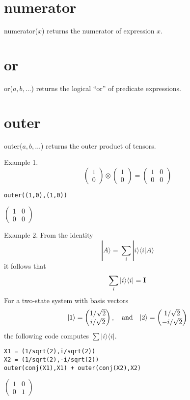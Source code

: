 \section*{numerator}
numerator($x$) returns the numerator of expression $x$.

\section*{or}
or($a,b,\ldots$) returns the logical ``or'' of predicate expressions.

\section*{outer}
outer($a,b,\ldots$) returns the outer product of tensors.

Example 1.
\[
\begin{pmatrix}
1\\
0
\end{pmatrix}
\otimes
\begin{pmatrix}
1\\
0
\end{pmatrix}
=\begin{pmatrix}
1 & 0\\
0 & 0
\end{pmatrix}
\]

\begin{Verbatim}[formatcom=\color{blue}]
outer((1,0),(1,0))
\end{Verbatim}

$\displaystyle
\begin{pmatrix}
1 & 0\\
0 & 0
\end{pmatrix}
$

\bigskip
Example 2. From the identity
\[
|A\rangle=\sum_i|i\rangle\langle i|A\rangle
\]
it follows that
\[
\sum_i|i\rangle\langle i|=\bf I
\]
For a two-state system with basis vectors
\[
|1\rangle=\begin{pmatrix}1/\sqrt2\\i/\sqrt2\end{pmatrix},
\hbox{\quad and\quad}
|2\rangle=\begin{pmatrix}1/\sqrt2\\-i/\sqrt2\end{pmatrix}
\]
the following code computes $\sum|i\rangle\langle i|$.
\begin{Verbatim}[formatcom=\color{blue}]
X1 = (1/sqrt(2),i/sqrt(2))
X2 = (1/sqrt(2),-i/sqrt(2))
outer(conj(X1),X1) + outer(conj(X2),X2)
\end{Verbatim}
$\displaystyle
\begin{pmatrix}
1 & 0\\
0 & 1
\end{pmatrix}
$


